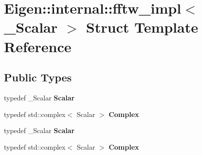 \hypertarget{struct_eigen_1_1internal_1_1fftw__impl}{}\section{Eigen\+:\+:internal\+:\+:fftw\+\_\+impl$<$ \+\_\+\+Scalar $>$ Struct Template Reference}
\label{struct_eigen_1_1internal_1_1fftw__impl}
\subsection*{Public Types}
\begin{DoxyCompactItemize}
\item 
\mbox{\label{struct_eigen_1_1internal_1_1fftw__impl_ad37ae1f2aad603ea1ea69c26b1674af5}} 
typedef \+\_\+\+Scalar {\bfseries Scalar}
\item 
\mbox{\label{struct_eigen_1_1internal_1_1fftw__impl_a9d8e84f20fe3651c1faef04b7fead298}} 
typedef std\+::complex$<$ Scalar $>$ {\bfseries Complex}
\item 
\mbox{\label{struct_eigen_1_1internal_1_1fftw__impl_ad37ae1f2aad603ea1ea69c26b1674af5}} 
typedef \+\_\+\+Scalar {\bfseries Scalar}
\item 
\mbox{\label{struct_eigen_1_1internal_1_1fftw__impl_a9d8e84f20fe3651c1faef04b7fead298}} 
typedef std\+::complex$<$ Scalar $>$ {\bfseries Complex}
\end{DoxyCompactItemize}
